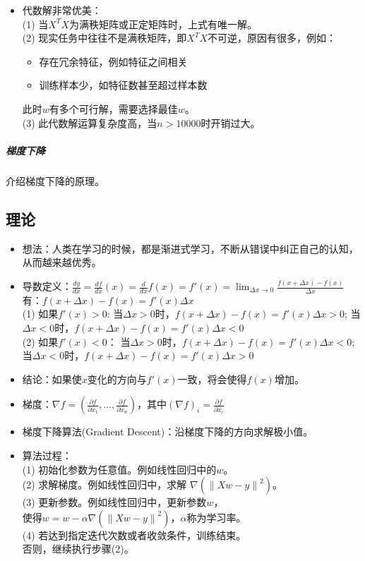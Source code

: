 \documentclass[10pt,a4paper]{ctexbook}
\begin{document}
\begin{itemize}
\item 代数解非常优美：\\
(1) 当$X^{T}X$为满秩矩阵或正定矩阵时，上式有唯一解。\\
(2) 现实任务中往往不是满秩矩阵，即$X^{T}X$不可逆，原因有很多，例如：
    \begin{itemize}
    \item 存在冗余特征，例如特征之间相关
    \item 训练样本少，如特征数甚至超过样本数
    \end{itemize}
此时$w$有多个可行解，需要选择最佳$w$。 \\
(3) 此代数解运算复杂度高，当$n>10000$时开销过大。\\

\end{itemize}

\subparagraph{梯度下降}
介绍梯度下降的原理。
\subsection{理论}

\begin{itemize}
\item 想法：人类在学习的时候，都是渐进式学习，不断从错误中纠正自己的认知，从而越来越优秀。
\item 导数定义：$ {\frac {dy}{dx}}={\frac {df}{dx}}(x)={\frac {d}{dx}}f(x)=f'(x)=\lim_{{\Delta x}\to 0}{\frac {f(x+{\Delta x})-f(x)}{\Delta x}} $\\
有：$f(x+{\Delta x})-f(x)=f'(x){\Delta x}$
\\(1) 如果$f'(x)>0$:
\subitem 当${\Delta x}>0$时，$f(x+{\Delta x})-f(x)=f'(x){\Delta x}>0$;
\subitem 当${\Delta x}<0$时，$f(x+{\Delta x})-f(x)=f'(x){\Delta x}<0$
\\(2) 如果$f'(x)<0$：
\subitem 当${\Delta x}>0$时，$f(x+{\Delta x})-f(x)=f'(x){\Delta x}<0$;
\subitem 当${\Delta x}<0$时，$f(x+{\Delta x})-f(x)=f'(x){\Delta x}>0$
\item 结论：如果使$x$变化的方向与$f'(x)$一致，将会使得$f(x)$增加。
\end{itemize}

\begin{itemize}
\item 梯度：$\nabla f=\left({\frac {\partial f}{\partial x_{1}}},\dots ,{\frac {\partial f}{\partial x_{n}}}\right)$，其中$\left(\nabla f\right)_{i}={\frac {\partial f}{\partial x_{i}}}$
\item 梯度下降算法(Gradient Descent)：沿梯度下降的方向求解极小值。
\item 算法过程：
\\(1) 初始化参数为任意值。例如线性回归中的$w$。
\\(2) 求解梯度。例如线性回归中，求解 $\nabla\left(\left\|{Xw-y}\right\|^{2}\right)$。
\\(3) 更新参数。例如线性回归中，更新参数$w$，\\使得$w=w-\alpha\nabla\left(\left\|{Xw-y}\right\|^{2}\right)$，$\alpha$称为学习率。
\\(4) 若达到指定迭代次数或者收敛条件，训练结束。\\否则，继续执行步骤(2)。
\end{itemize}
\end{document}
